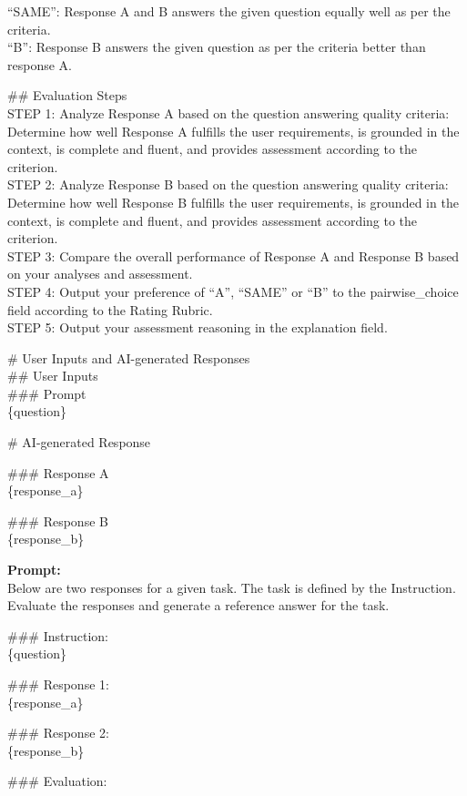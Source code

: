 \documentclass{article} %
\begin{document}
\begin{tcolorbox}[colback=gray!5!white, colframe=gray!60!black, title=Google Vertex Prompt, breakable]
``SAME'': Response A and B answers the given question equally well as per the criteria.\\
``B'': Response B answers the given question as per the criteria better than response A.\\\par
\#\# Evaluation Steps\\
STEP 1: Analyze Response A based on the question answering quality criteria: Determine how well Response A fulfills the user requirements, is grounded in the context, is complete and fluent, and provides assessment according to the criterion.\\
STEP 2: Analyze Response B based on the question answering quality criteria: Determine how well Response B fulfills the user requirements, is grounded in the context, is complete and fluent, and provides assessment according to the criterion.\\
STEP 3: Compare the overall performance of Response A and Response B based on your analyses and assessment.\\
STEP 4: Output your preference of ``A'', ``SAME'' or ``B'' to the pairwise\_choice field according to the Rating Rubric.\\
STEP 5: Output your assessment reasoning in the explanation field.\\\par
\# User Inputs and AI-generated Responses\\
\#\# User Inputs\\
\#\#\# Prompt\\
\{question\}\\\par
\# AI-generated Response\\\par
\#\#\# Response A\\
\{response\_a\}\\\par
\#\#\# Response B\\
\{response\_b\}
\end{tcolorbox}

\begin{tcolorbox}[colback=gray!5!white, colframe=gray!60!black, title=PandaLM Prompt, breakable]
\textbf{Prompt:}\\
Below are two responses for a given task. The task is defined by the Instruction. Evaluate the responses and generate a reference answer for the task.\\\par
\#\#\# Instruction:\\
\{question\}\\\par
\#\#\# Response 1:\\
\{response\_a\}\\\par
\#\#\# Response 2:\\
\{response\_b\}\\\par
\#\#\# Evaluation:
\end{tcolorbox}
\end{document}
